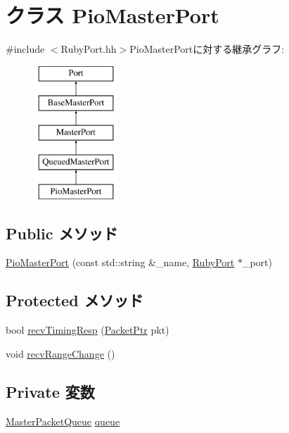 \hypertarget{classRubyPort_1_1PioMasterPort}{
\section{クラス PioMasterPort}
\label{classRubyPort_1_1PioMasterPort}
}


{\ttfamily \#include $<$RubyPort.hh$>$}PioMasterPortに対する継承グラフ:\begin{figure}[H]
\begin{center}
\leavevmode
\includegraphics[height=5cm]{classRubyPort_1_1PioMasterPort}
\end{center}
\end{figure}
\subsection*{Public メソッド}
\begin{DoxyCompactItemize}
\item 
\hyperlink{classRubyPort_1_1PioMasterPort_a53288266e38c91f9aecf50832e5d70fc}{PioMasterPort} (const std::string \&\_\-name, \hyperlink{classRubyPort}{RubyPort} $\ast$\_\-port)
\end{DoxyCompactItemize}
\subsection*{Protected メソッド}
\begin{DoxyCompactItemize}
\item 
bool \hyperlink{classRubyPort_1_1PioMasterPort_a482dba5588f4bee43e498875a61e5e0b}{recvTimingResp} (\hyperlink{classPacket}{PacketPtr} pkt)
\item 
void \hyperlink{classRubyPort_1_1PioMasterPort_aecf310a01b533ae8700eccac2cf20480}{recvRangeChange} ()
\end{DoxyCompactItemize}
\subsection*{Private 変数}
\begin{DoxyCompactItemize}
\item 
\hyperlink{classMasterPacketQueue}{MasterPacketQueue} \hyperlink{classRubyPort_1_1PioMasterPort_aae3ed0c3ef8ff189915e74fe401279b5}{queue}
\end{DoxyCompactItemize}


